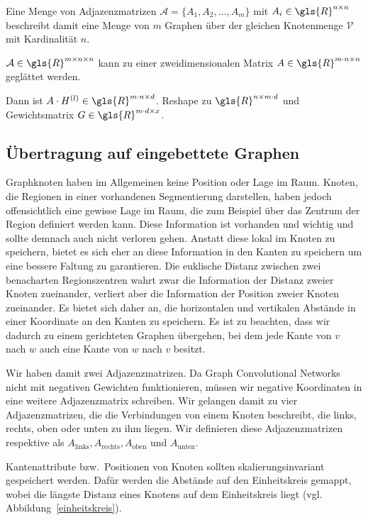 Eine Menge von Adjazenzmatrizen $\mathcal{A} = \lbrace A_1, A_2, \ldots, A_m \rbrace$ mit $A_i \in \gls{R}^{n \times n}$ beschreibt damit eine Menge von $m$ Graphen über der gleichen Knotenmenge $\mathcal{V}$ mit Kardinalität $n$.

$\mathcal{A} \in \gls{R}^{m \times n \times n}$ kann zu einer zweidimensionalen Matrix $A \in \gls{R}^{m \cdot n \times n}$ geglättet werden.

Dann ist $A \cdot H^{(l)} \in \gls{R}^{m \cdot n \times d}$.
Reshape zu $\gls{R}^{n \times m \cdot d}$ und Gewichtsmatrix $G \in \gls{R}^{m \cdot d \times x}$.

\subsection{Übertragung auf eingebettete Graphen}

Graphknoten haben im Allgemeinen keine Position oder Lage im Raum.
Knoten, die Regionen in einer vorhandenen Segmentierung darstellen, haben jedoch offensichtlich eine gewisse Lage im Raum, die zum Beispiel über das Zentrum der Region definiert werden kann.
Diese Information ist vorhanden und wichtig und sollte demnach auch nicht verloren gehen.
Anstatt diese lokal im Knoten zu speichern, bietet es sich eher an diese Information in den Kanten zu speichern um eine bessere Faltung zu garantieren.
Die euklische Distanz zwischen zwei benacharten Regionszentren wahrt zwar die Information der Distanz zweier Knoten zueinander, verliert aber die Information der Position zweier Knoten zueinander.
Es bietet sich daher an, die horizontalen und vertikalen Abstände in einer Koordinate an den Kanten zu speichern.
Es ist zu beachten, dass wir dadurch zu einem gerichteten Graphen übergehen, bei dem jede Kante von $v$ nach $w$ auch eine Kante von $w$ nach $v$ besitzt.

Wir haben damit zwei Adjazenzmatrizen.
Da Graph Convolutional Networks nicht mit negativen Gewichten funktionieren, müssen wir negative Koordinaten in eine weitere Adjazenzmatrix schreiben.
Wir gelangen damit zu vier Adjazenzmatrizen, die die Verbindungen von einem Knoten beschreibt, die links, rechts, oben oder unten zu ihm liegen.
Wir definieren diese Adjazenzmatrizen respektive als $A_{\text{links}}, A_{\text{rechts}}, A_{\text{oben}}$ und $A_{\text{unten}}$.

Kantenattribute bzw.\ Positionen von Knoten sollten skalierungsinvariant gespeichert werden.
Dafür werden die Abstände auf den Einheitskreis gemappt, wobei die längste Distanz eines Knotens auf dem Einheitskreis liegt (vgl. Abbildung~\ref{einheitskreis}).

